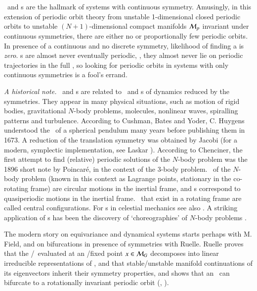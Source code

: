 \documentclass[preprint,number,sort&compress]{elsarticle}
\begin{document}
\Reqva\ and \rpo s are the hallmark of systems with
continuous symmetry. Amusingly, in this extension of periodic
orbit theory from unstable 1-dim\-ens\-ion\-al closed
periodic orbits to unstable $(N\!+\!1)$-dim\-ens\-ion\-al
compact manifolds ${\cal M}_p$ in\-vari\-ant under continuous
symmetries, there are either no or proportionally few
periodic orbits. In presence of a continuous and no discrete
symmetry, likelihood of finding a {\po} is {\em zero}. \Rpo s
are almost never eventually periodic, \ie, they almost never
lie on periodic trajectories in the full {\statesp}, so
looking for periodic orbits in systems with only continuous
symmetries is a fool's errand.

\emph{A historical note.}
\Reqva\ and \rpo s are
related to \eqva\ and \po s of dynamics
reduced by the symmetries. They appear in many physical
situations, such as motion of rigid bodies, gravitational
$N$-body problems, molecules, nonlinear waves, spiralling
patterns and turbulence. According to Cushman,
Bates and Yoder, C.
Huygens understood the \reqva\ of a spherical
pendulum many years before publishing them in 1673. A
reduction of the translation symmetry was obtained by Jacobi
(for a modern, symplectic implementation, see Laskar
\etal{}). According to Chenciner, the
first attempt to find (relative) periodic solutions of the
$N$-body problem was the 1896 short note by
Poincar\'e, in the context of the 3-body
problem. \Reqva\ of the $N$-body problem (known in this
context as Lagrange points, stationary in the co-rotating
frame) are circular motions in the inertial frame, and {\rpo
s} correspond to quasiperiodic motions in the inertial frame.
\Reqva\ that exist in a rotating frame are called central
configurations. For \rpo s in celestial mechanics see also
. A striking application of \rpo s has been
the discovery of `choreographies' of $N$-body problems%
.

The modern story on equivariance and dynamical systems starts
perhaps with M. Field, and on bifurcations in
presence of symmetries  with Ruelle. Ruelle
proves that the \stabmat/\jacobianM\ evaluated at an
\eqv/fixed point $x \in {\cal M}_G$ decomposes into linear
irreducible representations of \Group, and that
stable/unstable manifold continuations of its eigenvectors
inherit their symmetry properties, and shows that an \eqv\
can bifurcate to a rotationally in\-vari\-ant periodic orbit
(\ie, \reqv).
\end{document}
